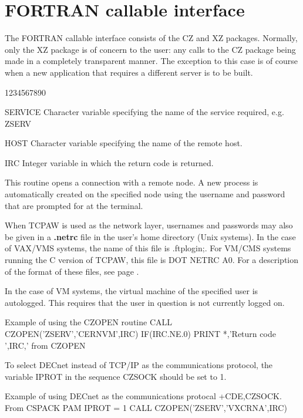 \chapter{FORTRAN callable interface}
\par
The FORTRAN callable interface consists of the CZ and XZ packages.
Normally, only the XZ package is of concern to the user: any calls
to the CZ package being made in a completely transparent manner.
The exception to this case is of course when a new application
that requires a different server is to be built.
\begin{DLtt}{1234567890}
\item[SERVICE]Character variable specifying the name of the service required,
e.g. ZSERV
\item[HOST]Character variable specifying the name of the remote host.
\item[IRC]Integer variable in which the return code is returned.
\end{DLtt}
\par
This routine opens a connection with a remote node. A new process
is automatically created on the specified node using the username
and password that are prompted for at the terminal.
\par
When TCPAW is used as the network layer, usernames and passwords
may also be given in a {\bf .netrc} file in the user's home
directory (Unix systems).
In the case of VAX/VMS systems,
the name of this file is .ftplogin;.
For VM/CMS systems running the C version of TCPAW,
this file is DOT NETRC A0.
For a description of the format of these files, see page \pageref{NETRC}.
\par
In the case of VM systems, the virtual machine of the specified
user is autologged. This requires that the user in question
is not currently logged on.
\begin{XMPt}{Example of using the CZOPEN routine}
      CALL CZOPEN('ZSERV','CERNVM',IRC)
      IF(IRC.NE.0) PRINT *,'Return code ',IRC,' from CZOPEN
\end{XMPt}
\par
To select DECnet instead of TCP/IP as the communications protocol,
the variable IPROT in the sequence CZSOCK should be set to 1.
\begin{XMPt}{Example of using DECnet as the communications protocal}
+CDE,CZSOCK. From CSPACK PAM
     IPROT = 1
     CALL CZOPEN('ZSERV','VXCRNA',IRC)
\end{XMPt}
